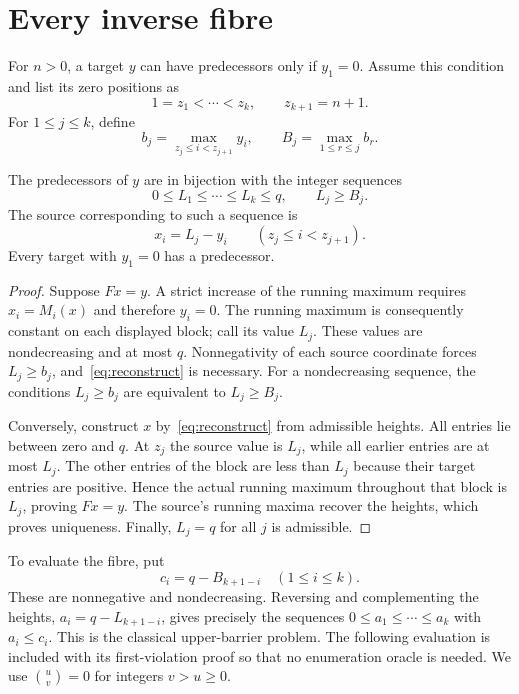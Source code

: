 \section{Every inverse fibre}\label{sec:inverse}

For $n>0$, a target $y$ can have predecessors only if $y_1=0$.
Assume this condition and list its zero positions as
\[
 1=z_1<\cdots<z_k,\qquad z_{k+1}=n+1.
\]
For $1\le j\le k$, define
\begin{equation}\label{eq:barriers}
 b_j=\max_{z_j\le i<z_{j+1}}y_i,
 \qquad B_j=\max_{1\le r\le j}b_r.
\end{equation}

\begin{theorem}\label{thm:inverse}
The predecessors of $y$ are in bijection with the integer sequences
\begin{equation}\label{eq:heights}
 0\le L_1\le\cdots\le L_k\le q,\qquad L_j\ge B_j.
\end{equation}
The source corresponding to such a sequence is
\begin{equation}\label{eq:reconstruct}
 x_i=L_j-y_i\qquad(z_j\le i<z_{j+1}).
\end{equation}
Every target with $y_1=0$ has a predecessor.
\end{theorem}
\begin{proof}
Suppose $Fx=y$. A strict increase of the running maximum requires
$x_i=M_i(x)$ and therefore $y_i=0$. The running maximum is consequently
constant on each displayed block; call its value $L_j$. These values are
nondecreasing and at most $q$. Nonnegativity of each source coordinate
forces $L_j\ge b_j$, and~\eqref{eq:reconstruct} is necessary. For a
nondecreasing sequence, the conditions $L_j\ge b_j$ are equivalent to
$L_j\ge B_j$.

Conversely, construct $x$ by~\eqref{eq:reconstruct} from admissible
heights. All entries lie between zero and $q$. At $z_j$ the source value
is $L_j$, while all earlier entries are at most $L_j$. The other entries
of the block are less than $L_j$ because their target entries are
positive. Hence the actual running maximum throughout that block is
$L_j$, proving $Fx=y$. The source's running maxima recover the heights,
which proves uniqueness. Finally, $L_j=q$ for all $j$ is admissible.
\end{proof}

To evaluate the fibre, put
\begin{equation}\label{eq:upper}
 c_i=q-B_{k+1-i}\quad(1\le i\le k).
\end{equation}
These are nonnegative and nondecreasing. Reversing and complementing the
heights, $a_i=q-L_{k+1-i}$, gives precisely the sequences
$0\le a_1\le\cdots\le a_k$ with $a_i\le c_i$.
This is the classical upper-barrier problem. The following evaluation is
included with its first-violation proof so that no enumeration oracle is
needed. We use $\binom{u}{v}=0$ for integers $v>u\ge0$.

